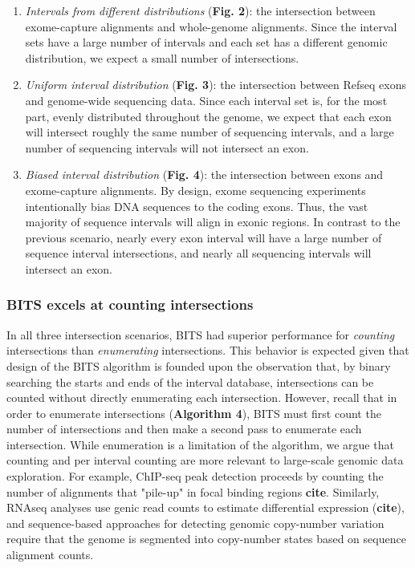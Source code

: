 \documentclass{bioinfo}
\begin{document}
		\begin{enumerate}
			\item

			{\em Intervals from different distributions} (\textbf{Fig. 2}): the intersection between exome-capture 
			alignments and whole-genome alignments. Since the interval sets have a large number of intervals
			and each set has a different genomic distribution, we expect a small number of intersections.
			
			\item
			{\em Uniform interval distribution} (\textbf{Fig. 3}): the intersection between 
			Refseq exons and genome-wide sequencing data.  Since each interval set
			is, for the most part, evenly distributed throughout the genome, we expect 
			that each exon will intersect roughly the same number of sequencing intervals, 
			and a large number of sequencing intervals will not intersect an exon.

			\item
			{\em Biased interval distribution} (\textbf{Fig. 4}):  the intersection between exons and exome-capture
			alignments.  By design, exome sequencing experiments intentionally bias DNA sequences to the coding exons.  
			Thus, the vast majority of sequence intervals will align in exonic regions. In contrast to the previous 
			scenario, nearly every exon interval will have a large number of sequence interval intersections, and 
			nearly all sequencing intervals will intersect an exon.
		\end{enumerate}

	\subsubsection{BITS excels at counting intersections}
	In all three intersection scenarios, BITS had superior performance for \emph{counting} intersections
	than \emph{enumerating} intersections. This behavior is expected given that design of the BITS algorithm
	is founded upon the observation that, by binary searching the starts and ends of the interval database, 
	intersections can be counted without directly enumerating each intersection. However, recall that in order to enumerate
	intersections (\textbf{Algorithm 4}), BITS must first count the number of intersections and then make 
	a second pass to enumerate each intersection. While enumeration is a limitation of the algorithm, 
	we argue that counting and per interval counting are more relevant to large-scale genomic data exploration. 
	For example, ChIP-seq peak detection proceeds by counting the number of alignments that "pile-up" in focal binding regions \textbf{cite}.
	Similarly, RNAseq analyses use genic read counts to estimate differential expression (\textbf{cite}), and sequence-based 
	approaches for detecting genomic copy-number variation require that the genome is segmented into copy-number states based
	on sequence alignment counts.
	
\end{document}
